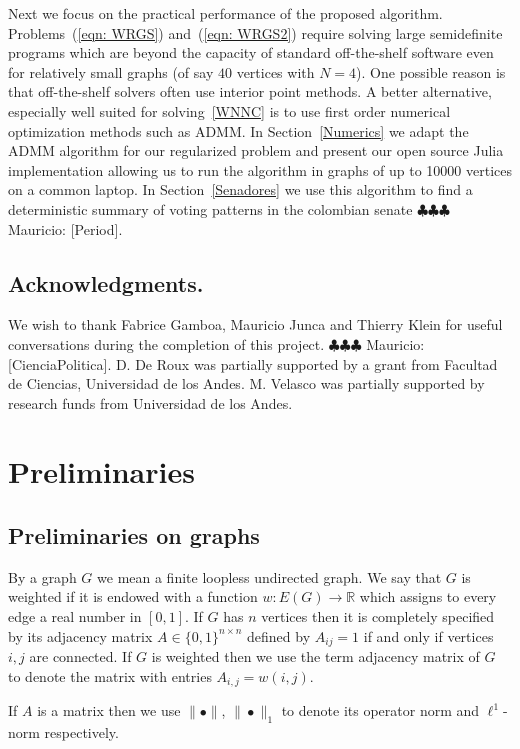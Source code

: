 \documentclass[12pt]{amsart}
\theoremstyle{remark}
\newcommand{\RR}{\mathbb{R}}
\newcommand{\mv}[1]{{\color{red} \sf $\clubsuit\clubsuit\clubsuit$ Mauricio: [#1]}}
\begin{document}
Next we focus on the practical performance of the proposed algorithm. Problems~(\ref{eqn: WRGS}) and~(\ref{eqn: WRGS2}) require solving large semidefinite programs which are beyond the  capacity of standard off-the-shelf software even for relatively small graphs (of say $40$ vertices with $N=4$). One possible reason is that off-the-shelf solvers often use interior point methods. A better alternative, especially well suited for solving~\ref{WNNC} is to use first order numerical optimization methods such as ADMM. In Section~\ref{Numerics} we adapt the ADMM algorithm for our regularized problem and present our open source Julia implementation allowing us to run the algorithm in graphs of up to 10000 vertices on a common laptop. In Section~\ref{Senadores} we use this algorithm to find a deterministic summary of voting patterns in the colombian senate \mv{Period}. 

\subsection{Acknowledgments.}
We wish to thank Fabrice Gamboa, Mauricio Junca and Thierry Klein for useful conversations during the completion of this project. \mv{CienciaPolitica}.
D. De Roux was partially supported by a grant from Facultad de Ciencias, Universidad de los Andes. M. Velasco was partially supported by research funds from Universidad de los Andes. 

\section{Preliminaries}


\subsection{ Preliminaries on graphs}

By a graph $G$ we mean a finite loopless undirected graph. We say that $G$ is weighted if it is endowed with a function $w: E(G)\rightarrow \RR$ which assigns to every edge a real number in $[0,1]$. If $G$ has $n$ vertices then it is completely specified by its adjacency matrix $A\in \{0,1\}^{n\times n}$ defined by $A_{ij}=1$ if and only if vertices $i,j$ are connected. If $G$ is weighted then we use the term adjacency matrix of $G$ to denote the matrix with entries $A_{i,j}=w(i,j)$. 

If $A$ is a matrix then we use $\|\bullet\|$, $\|\bullet\|_1$ to denote its operator norm and $\ell^1$-norm respectively.
\end{document}
